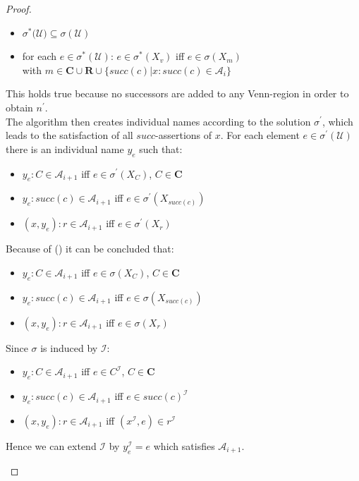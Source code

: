 \documentclass{book}
\theoremstyle{break}
\theoremstyle{definition}
\begin{document}
\begin{proof}
\begin{itemize}
\begin{itemize}
\item $\sigma^\ast(\mathcal{U)}\subseteq\sigma(\mathcal{U})$
\item for each $e\in \sigma^\ast(\mathcal{U})$: $e\in \sigma^\ast(X_v)$ iff $e\in\sigma(X_m)$\\
with $m\in\mathbf{C}\cup\mathbf{R}\cup\{succ(c)|x:succ(c)\in \mathcal{A}_i\}$
\end{itemize}
This holds true because no successors are added to any Venn-region in order to obtain $n^\prime$.\\
The algorithm then creates individual names according to the solution $\sigma^\prime$, which leads to the satisfaction of all $succ$-assertions of $x$. For each element $e\in\sigma^\prime(\mathcal{U})$ there is an individual name $y_e$ such that:
\begin{itemize}
\item $y_e:C\in\mathcal{A}_{i+1}$ iff $e\in\sigma^\prime(X_C)$, $C\in\mathbf{C}$
\item $y_e:succ(c)\in\mathcal{A}_{i+1}$ iff $e\in\sigma^\prime(X_{succ(c)})$
\item $(x,y_e):r\in\mathcal{A}_{i+1}$ iff $e\in\sigma^\prime(X_r)$
\end{itemize}
Because of (\dag) it can be concluded that:
\begin{itemize}
\item $y_e:C\in\mathcal{A}_{i+1}$ iff $e\in\sigma(X_C)$, $C\in\mathbf{C}$
\item $y_e:succ(c)\in\mathcal{A}_{i+1}$ iff $e\in\sigma(X_{succ(c)})$
\item $(x,y_e):r\in\mathcal{A}_{i+1}$ iff $e\in\sigma(X_r)$
\end{itemize}
Since $\sigma$ is induced by $\mathcal{I}$:
\begin{itemize}
\item $y_e:C\in\mathcal{A}_{i+1}$ iff $e\in C^\mathcal{I}$, $C\in\mathbf{C}$
\item $y_e:succ(c)\in\mathcal{A}_{i+1}$ iff $e\in succ(c)^\mathcal{I}$
\item $(x,y_e):r\in\mathcal{A}_{i+1}$ iff $(x^\mathcal{I},e)\in r^\mathcal{I}$
\end{itemize}
Hence we can extend $\mathcal{I}$ by $y_e^\mathcal{I}=e$ which satisfies $\mathcal{A}_{i+1}$.
\end{itemize}
\end{proof}
\end{document}
